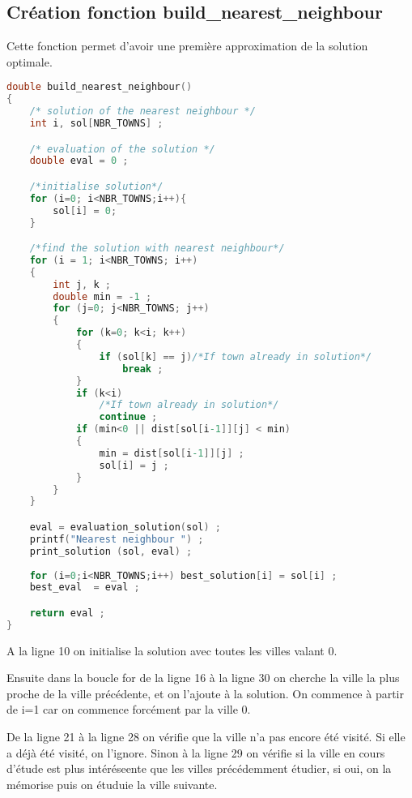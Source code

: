 \documentclass[11pt]{article}
\begin{document}
\subsection{Création fonction build\_nearest\_neighbour}

Cette fonction permet d'avoir une première approximation de la solution optimale.

\begin{lstlisting}[language=C]
double build_nearest_neighbour()
{
    /* solution of the nearest neighbour */
    int i, sol[NBR_TOWNS] ;

    /* evaluation of the solution */
    double eval = 0 ;

    /*initialise solution*/
    for (i=0; i<NBR_TOWNS;i++){
        sol[i] = 0;
    }

    /*find the solution with nearest neighbour*/
    for (i = 1; i<NBR_TOWNS; i++)
    {
        int j, k ;
        double min = -1 ;
        for (j=0; j<NBR_TOWNS; j++)
        {
            for (k=0; k<i; k++)
            {
                if (sol[k] == j)/*If town already in solution*/
                    break ;
            }
            if (k<i)
                /*If town already in solution*/
                continue ;
            if (min<0 || dist[sol[i-1]][j] < min)
            {
                min = dist[sol[i-1]][j] ;
                sol[i] = j ;
            }
        }
    }

    eval = evaluation_solution(sol) ;
    printf("Nearest neighbour ") ;
    print_solution (sol, eval) ;
    
    for (i=0;i<NBR_TOWNS;i++) best_solution[i] = sol[i] ;
    best_eval  = eval ;

    return eval ;
}

\end{lstlisting}

A la ligne 10 on initialise la solution avec toutes les villes valant 0.

Ensuite dans la boucle for de la ligne 16 à la ligne 30 on cherche la ville la plus proche de la ville précédente, et on l'ajoute à la solution. On commence à partir de i=1 car on commence forcément par la ville 0.

De la ligne 21 à la ligne 28 on vérifie que la ville n'a pas encore été visité. Si elle a déjà été visité, on l'ignore. Sinon à la ligne 29 on vérifie si la ville en cours d'étude est plus intéréseente que les villes précédemment étudier, si oui, on la mémorise puis on étuduie la ville suivante.
\end{document}
